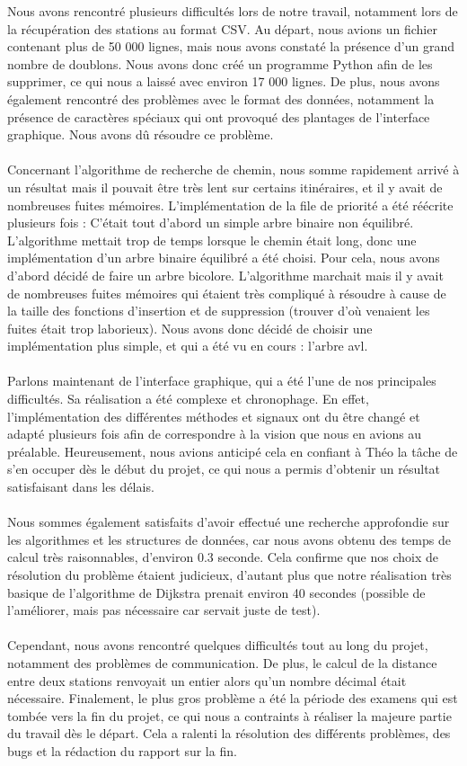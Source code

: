 \documentclass[12pt,titlepage]{report}
\begin{document}
Nous avons rencontré plusieurs difficultés lors de notre travail, notamment lors de la récupération des stations au format CSV. Au départ, nous avions un fichier contenant plus de 50 000 lignes, mais nous avons constaté la présence d'un grand nombre de doublons. Nous avons donc créé un programme Python afin de les supprimer, ce qui nous a laissé avec environ 17 000 lignes. De plus, nous avons également rencontré des problèmes avec le format des données, notamment la présence de caractères spéciaux qui ont provoqué des plantages de l'interface graphique. Nous avons dû résoudre ce problème.
\\ \\
Concernant l'algorithme de recherche de chemin, nous somme rapidement arrivé à un résultat mais il pouvait être très lent sur certains itinéraires, et il y avait de nombreuses fuites mémoires.
L'implémentation de la file de priorité a été réécrite plusieurs fois : C'était tout d'abord un simple arbre binaire non équilibré. L'algorithme mettait trop de temps lorsque le chemin était long, donc une implémentation d'un arbre binaire équilibré a été choisi. Pour cela, nous avons d'abord décidé de faire un arbre bicolore. L'algorithme marchait mais il y avait de nombreuses fuites mémoires qui étaient très compliqué à résoudre à cause de la taille des fonctions d'insertion et de suppression (trouver d'où venaient les fuites était trop laborieux). Nous avons donc décidé de choisir une implémentation plus simple, et qui a été vu en cours : l'arbre avl.
\\ \\
Parlons maintenant de l'interface graphique, qui a été l'une de nos principales difficultés. Sa réalisation a été complexe et chronophage. En effet, l'implémentation des différentes méthodes et signaux ont du être changé et adapté plusieurs fois afin de correspondre à la vision que nous en avions au préalable. Heureusement, nous avions anticipé cela en confiant à Théo la tâche de s'en occuper dès le début du projet, ce qui nous a permis d'obtenir un résultat satisfaisant dans les délais.
\\ \\
Nous sommes également satisfaits d'avoir effectué une recherche approfondie sur les algorithmes et les structures de données, car nous avons obtenu des temps de calcul très raisonnables, d'environ 0.3 seconde. Cela confirme que nos choix de résolution du problème étaient judicieux, d'autant plus que notre réalisation très basique de l'algorithme de Dijkstra prenait environ 40 secondes (possible de l'améliorer, mais pas nécessaire car servait juste de test).
\\ \\
Cependant, nous avons rencontré quelques difficultés tout au long du projet, notamment des problèmes de communication. De plus, le calcul de la distance entre deux stations renvoyait un entier alors qu'un nombre décimal était nécessaire. Finalement, le plus gros problème a été la période des examens qui est tombée vers la fin du projet, ce qui nous a contraints à réaliser la majeure partie du travail dès le départ. Cela a ralenti la résolution des différents problèmes, des bugs et la rédaction du rapport sur la fin.
\end{document}

